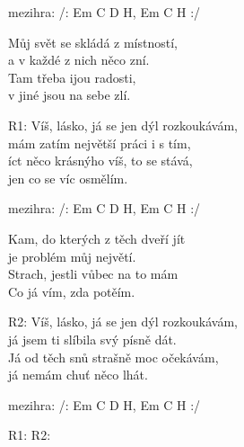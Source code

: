 
\re{}
mezihra: /: Em C D H, Em C H :/

\ve{}
Můj svět se skládá z místností,\\
a v každé z nich něco zní.\\
Tam třeba ijou radosti,\\
v jiné jsou na sebe zlí.

\re{}R1:
Víš, lásko, já se jen dýl rozkoukávám,\\
mám zatím největší práci i s tím,\\
íct něco krásnýho víš, to se stává,\\
jen co se víc osmělím. 

\re{}
mezihra: /: Em C D H, Em C H :/

\ve{}
Kam, do kterých z těch dveří jít\\
 je problém můj největí.\\
Strach, jestli vůbec na to mám\\
Co já vím, zda potěím.

\re{}R2:
Víš, lásko, já se jen dýl rozkoukávám,\\
já jsem ti slíbila svý písně dát.\\
Já od těch snů strašně moc očekávám,\\
já nemám chuť něco lhát.

\re{}
mezihra: /: Em C D H, Em C H :/

\re{}R1:
\re{}R2:
\esong{}